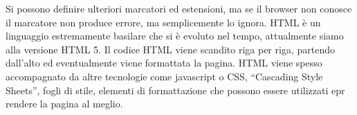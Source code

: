 \documentclass{article}
\numberwithin{equation}{subsection}
\begin{document}
Si possono definire ulteriori marcatori ed estensioni, ma se il browser non conosce il marcatore non produce errore, ma semplicemente lo ignora. 
HTML è un linguaggio estremamente basilare che si è evoluto nel tempo, attualmente siamo alla versione HTML 5. 
Il codice HTML viene scandito riga per riga, partendo dall'alto ed eventualmente viene formattata la pagina. HTML viene spesso accompagnato da altre tecnologie come 
javascript o CSS, ``Cascading Style Sheets'', fogli di stile, elementi di formattazione che possono essere utilizzati epr rendere la pagina al meglio. 
\end{document}
